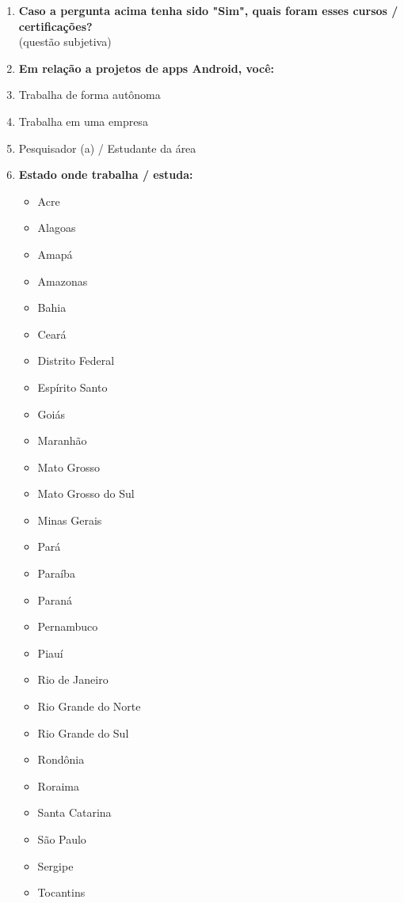 \begin{enumerate}[label=\bf A\arabic*,leftmargin=1.8cm]
\begin{enumerate}[label= \arabic*]
        \item \textbf{Caso a pergunta acima tenha sido "Sim", quais foram esses cursos / certificações?}\\
        (questão subjetiva)
        
        \item \textbf{Em relação a projetos de apps Android, você:}\\
        \item Trabalha de forma autônoma
        \item Trabalha em uma empresa
        \item Pesquisador (a) / Estudante da área
        
        \item \textbf{Estado onde trabalha / estuda:}
        \begin{itemize}
            \item Acre
            \item Alagoas
            \item Amapá
            \item Amazonas
            \item Bahia
            \item Ceará
            \item Distrito Federal
            \item Espírito Santo
            \item Goiás
            \item Maranhão
            \item Mato Grosso
            \item Mato Grosso do Sul
            \item Minas Gerais
            \item Pará
            \item Paraíba
            \item Paraná
            \item Pernambuco
            \item Piauí
            \item Rio de Janeiro
            \item Rio Grande do Norte
            \item Rio Grande do Sul
            \item Rondônia
            \item Roraima
            \item Santa Catarina
            \item São Paulo
            \item Sergipe
            \item Tocantins 
        \end{itemize}
        

\end{enumerate}
\end{enumerate}
